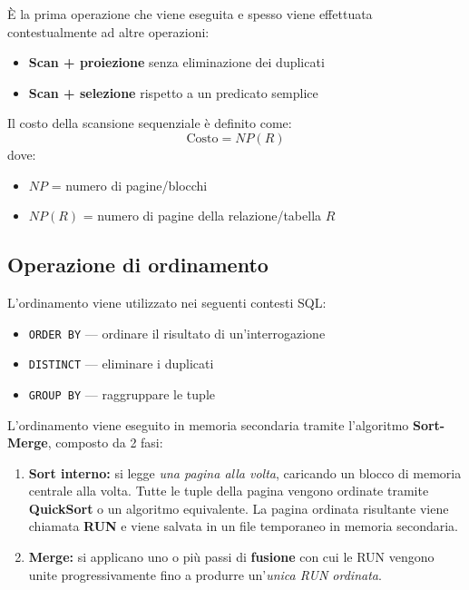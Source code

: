 È la prima operazione che viene eseguita e spesso viene effettuata contestualmente ad altre operazioni:

\begin{itemize}
	\item \textbf{Scan + proiezione} senza eliminazione dei duplicati
	\item \textbf{Scan + selezione} rispetto a un predicato semplice
\end{itemize}

Il costo della scansione sequenziale è definito come:
\[
\text{Costo} = NP(R)
\]
dove:
\begin{itemize}
	\item $NP$ = numero di pagine/blocchi
	\item $NP(R)$ = numero di pagine della relazione/tabella $R$
\end{itemize}

\subsection{Operazione di ordinamento}

L'ordinamento viene utilizzato nei seguenti contesti SQL:

\begin{itemize}
	\item \texttt{ORDER BY} — ordinare il risultato di un'interrogazione
	\item \texttt{DISTINCT} — eliminare i duplicati
	\item \texttt{GROUP BY} — raggruppare le tuple
\end{itemize}

L'ordinamento viene eseguito in memoria secondaria tramite l'algoritmo \textbf{Sort-Merge}, composto da 2 fasi:

\begin{enumerate}
	\item \textbf{Sort interno:} si legge \textit{una pagina alla volta}, caricando un blocco di memoria centrale alla volta. Tutte le tuple della pagina vengono ordinate tramite \textbf{QuickSort} o un algoritmo equivalente. La pagina ordinata risultante viene chiamata \textbf{RUN} e viene salvata in un file temporaneo in memoria secondaria.
	
	\item \textbf{Merge:} si applicano uno o più passi di \textbf{fusione} con cui le RUN vengono unite progressivamente fino a produrre un'\textit{unica RUN ordinata}.
\end{enumerate}

